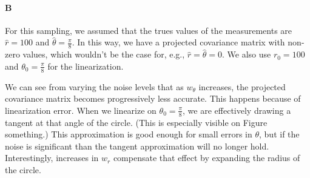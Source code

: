 \documentclass[12pt]{article}
\begin{document}
\paragraph{B} For this sampling, we assumed that the trues values of the measurements are $\hat{r}=100$ and $\hat{\theta}=\frac{\pi}{8}$. In this way, we have a projected covariance matrix with non-zero values, which wouldn't be the case for, e.g., $\hat{r}=\hat{\theta}=0$. We also use $r_0=100$ and $\theta_0=\frac{\pi}{8}$ for the linearization.


We can see from varying the noise levels that as $w_\theta$ increases, the projected covariance matrix becomes progressively less accurate. This happens because of linearization error. When we linearize on $\theta_0=\frac{\pi}{8}$, we are effectively drawing a tangent at that angle of the circle. (This is especially visible on Figure something.) This approximation is good enough for small errors in $\theta$, but if the noise is significant than the tangent approximation will no longer hold. Interestingly, increases in $w_r$ compensate that effect by expanding the radius of the circle.

\end{document}
